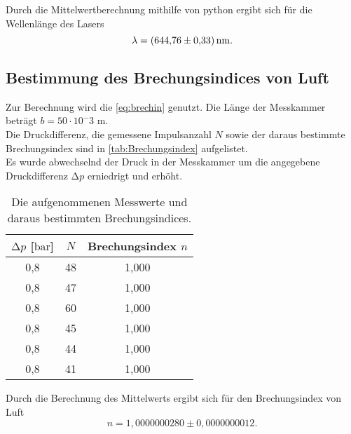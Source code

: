   Durch die Mittelwertberechnung mithilfe von python \cite{uncertainties} ergibt sich für die Wellenlänge des Lasers
\begin{equation*}
  \lambda = \SI{644,76 \pm 0,33}{\nano\metre}.
\end{equation*}



\subsection{Bestimmung des Brechungsindices von Luft}

Zur Berechnung wird die \autoref{eq:brechin} genutzt. Die Länge der Messkammer beträgt $b = 50 \cdot 10^-3$ m.\\
Die Druckdifferenz, die gemessene Impulsanzahl $N$ sowie der daraus bestimmte Brechungsindex sind in \autoref{tab:Brechungsindex} aufgelistet.\\
Es wurde abwechselnd der Druck in der Messkammer um die angegebene Druckdifferenz $\increment p$ erniedrigt und erhöht.\\

  \begin{table}[h]
    \centering
    \caption{Die aufgenommenen Messwerte und daraus bestimmten Brechungsindices.}
    \label{tab:Brechungsindex}
    \begin{tabular}{c c c}
      \toprule
      {$\increment p$ [$\si{\bar}$]} & {$N$} & {Brechungsindex $n$} \\
      \midrule
      0,8    &   48  &  1,000 \\
      0,8    &   47  &  1,000 \\
      0,8    &   60  &  1,000 \\
      0,8    &   45  &  1,000 \\
      0,8    &   44  &  1,000 \\
      0,8    &   41  &  1,000 \\
      
      \bottomrule
    \end{tabular}
  \end{table}
  \noindent
  Durch die Berechnung des Mittelwerts ergibt sich für den Brechungsindex von Luft
  \begin{equation*}
    n = 1,0000000280 \pm 0,0000000012.
  \end{equation*}
